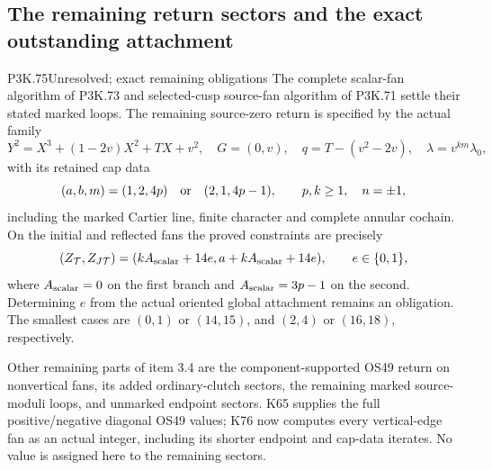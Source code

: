 \subsection{The remaining return sectors and the exact outstanding attachment}
\begin{statement}{P3K.75}{Unresolved; exact remaining obligations}
The complete scalar-fan algorithm of P3K.73 and selected-cusp
source-fan algorithm of P3K.71 settle their stated marked loops.
The remaining source-zero return is specified by the actual family
\[
 Y^2=X^3+(1-2v)X^2+TX+v^2,\quad G=(0,v),\quad
 q=T-(v^2-2v),\quad \lambda=v^{km}\lambda_0,
\]
with its retained cap data
\[
 (a,b,m)=(1,2,4p)\quad\hbox{or}\quad(2,1,4p-1),
 \qquad p,k\ge1,\quad n=\pm1,
\]
including the marked Cartier line, finite character and complete
annular cochain. On the initial and reflected fans the proved
constraints are precisely
\[
 (Z_{\mathcal T},Z_{J\mathcal T})=
 (kA_{\rm scalar}+14e,a+kA_{\rm scalar}+14e),\qquad
 e\in\{0,1\},
\]
where \(A_{\rm scalar}=0\) on the first branch and
\(A_{\rm scalar}=3p-1\) on the second. Determining \(e\)
from the actual oriented global attachment remains an obligation.
The smallest cases are \((0,1)\) or \((14,15)\), and
\((2,4)\) or \((16,18)\), respectively.

Other remaining parts of item 3.4 are the component-supported
OS49 return on nonvertical fans, its added ordinary-clutch sectors,
the remaining marked source-moduli loops, and unmarked endpoint
sectors. K65 supplies the full positive/negative diagonal OS49
values; K76 now computes every vertical-edge fan as an actual
integer, including its shorter endpoint and cap-data iterates.
No value is assigned here to the remaining sectors.
\end{statement}
